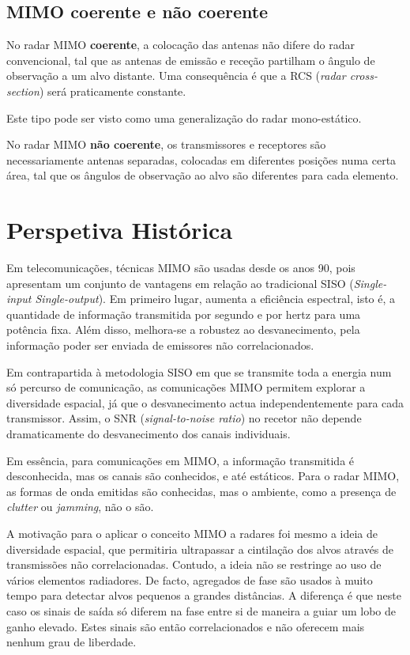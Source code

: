 \documentclass[purist,portuguese]{ist-report}
\begin{document}
\subsection{MIMO coerente e não coerente}

No radar MIMO \textbf{coerente}, a colocação das antenas não difere do radar convencional, tal que as antenas de emissão e receção partilham o ângulo de observação a um alvo distante.
Uma consequência é que a RCS (\textit{radar cross-section}) será praticamente constante.

Este tipo pode ser visto como uma generalização do radar mono-estático.

No radar MIMO \textbf{não coerente}, os transmissores e receptores são necessariamente antenas separadas, colocadas em diferentes posições numa certa área, tal que os ângulos de observação ao alvo são diferentes para cada elemento.

\section{Perspetiva Histórica}

Em telecomunicações, técnicas MIMO são usadas desde os anos 90, pois apresentam um conjunto de vantagens em relação ao tradicional SISO (\textit{Single-input Single-output}).
Em primeiro lugar, aumenta a eficiência espectral, isto é, a quantidade de informação transmitida por segundo e por hertz para uma potência fixa. 
Além disso, melhora-se a robustez ao desvanecimento, pela informação poder ser enviada de emissores não correlacionados.

Em contrapartida à metodologia SISO em que se transmite toda a energia num só percurso de comunicação, as comunicações MIMO permitem explorar a diversidade espacial, já que o desvanecimento actua independentemente para cada transmissor.
Assim, o SNR (\textit{signal-to-noise ratio}) no recetor não depende dramaticamente do desvanecimento dos canais individuais.

Em essência, para comunicações em MIMO, a informação transmitida é desconhecida, mas os canais são conhecidos, e até estáticos. Para o radar MIMO, as formas de onda emitidas são conhecidas, mas o ambiente, como a presença de \textit{clutter} ou \textit{jamming}, não o são.

A motivação para o aplicar o conceito MIMO a radares foi mesmo a ideia de diversidade espacial, que permitiria ultrapassar a cintilação dos alvos através de transmissões não correlacionadas.
Contudo, a ideia não se restringe ao uso de vários elementos radiadores.
De facto, agregados de fase  são usados à muito tempo para detectar alvos pequenos a grandes distâncias.
A diferença é que neste caso os sinais de saída só diferem na fase entre si de maneira a guiar um lobo de ganho elevado. 
Estes sinais são então correlacionados e não oferecem mais nenhum grau de liberdade.
\end{document}
